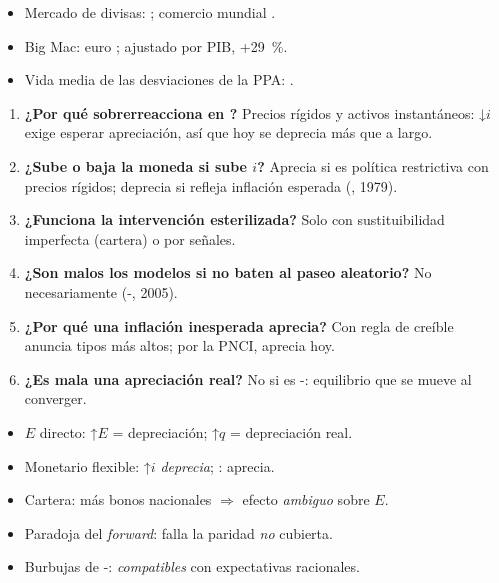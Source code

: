 \documentclass{article}
\begin{document}
\begin{columnas}
\anexorepaso
{}
\begin{itemize}
\item Mercado de divisas: ; comercio mundial .
\item Big Mac: euro ; ajustado por PIB, +29~\%.
\item Vida media de las desviaciones de la PPA: .
\end{itemize}
\begin{enumerate}
\item \textbf{¿Por qué sobrerreacciona en ?} Precios rígidos y activos instantáneos: ↓$i$ exige esperar apreciación, así que hoy se deprecia más que a largo.
\item \textbf{¿Sube o baja la moneda si sube $i$?} Aprecia si es política restrictiva con precios rígidos; deprecia si refleja inflación esperada (, 1979).
\item \textbf{¿Funciona la intervención esterilizada?} Solo con sustituibilidad imperfecta (cartera) o por señales.
\item \textbf{¿Son malos los modelos si no baten al paseo aleatorio?} No necesariamente (-, 2005).
\item \textbf{¿Por qué una inflación inesperada aprecia?} Con regla de  creíble anuncia tipos más altos; por la PNCI, aprecia hoy.
\item \textbf{¿Es mala una apreciación real?} No si es -: equilibrio que se mueve al converger.
\end{enumerate}
\begin{trampa}
\begin{itemize}
\item $E$ directo: ↑$E$ = depreciación; ↑$q$ = depreciación real.
\item Monetario flexible: ↑$i$ \emph{deprecia}; : aprecia.
\item Cartera: más bonos nacionales $\Rightarrow$ efecto \emph{ambiguo} sobre $E$.
\item Paradoja del \emph{forward}: falla la paridad \emph{no} cubierta.
\item Burbujas de -: \emph{compatibles} con expectativas racionales.
\end{itemize}
\end{trampa}

\end{columnas}
\end{document}
